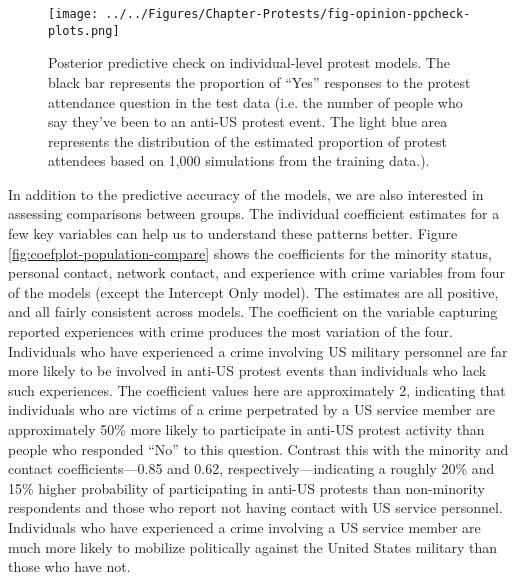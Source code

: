 			
			
			\begin{figure}[t]
				\centering\texttt{[image: ../../Figures/Chapter-Protests/fig-opinion-ppcheck-plots.png]}
				\caption{Posterior predictive check on individual-level protest models. The black bar represents the proportion of ``Yes'' responses to the protest attendance question in the test data (i.e. the number of people who say they've been to an anti-US protest event. The light blue area represents the distribution of the estimated proportion of protest attendees based on 1,000 simulations from the training data.).}
				\label{fig:ppcheck-individual-protest}
			\end{figure}
			
			
			In addition to the predictive accuracy of the models, we are also interested in assessing comparisons between groups. The individual coefficient estimates for a few key variables can help us to understand these patterns better. Figure \ref{fig:coefplot-population-compare} shows the coefficients for the minority status, personal contact, network contact, and experience with crime variables from four of the models (except the Intercept Only model). The estimates are all positive, and all fairly consistent across models. The coefficient on the variable capturing reported experiences with crime produces the most variation of the four. Individuals who have experienced a crime involving US military personnel are far more likely to be involved in anti-US protest events than individuals who lack such experiences. The coefficient values here are approximately 2, indicating that individuals who are victims of a crime perpetrated by a US service member are approximately 50\% more likely to participate in anti-US protest activity than people who responded ``No'' to this question. Contrast this with the minority and contact coefficients---0.85 and 0.62, respectively---indicating a roughly 20\% and 15\% higher probability of participating in anti-US protests than non-minority respondents and those who report not having contact with US service personnel. Individuals who have experienced a crime involving a US service member are much more likely to mobilize politically against the United States military than those who have not. 
			

